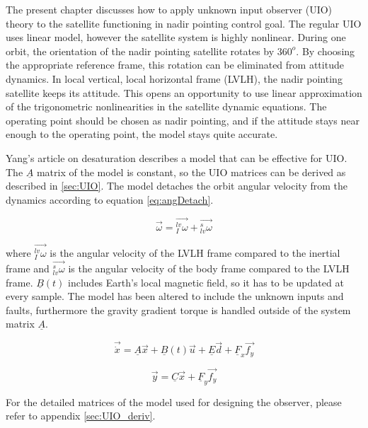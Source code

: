 The present chapter discusses how to apply unknown input observer (UIO) theory to the satellite functioning in nadir pointing control goal. The regular UIO uses linear model, however the satellite system is highly nonlinear.  During one orbit, the orientation of the nadir pointing satellite rotates by $360^o$. By choosing the appropriate reference frame, this rotation can be eliminated from attitude dynamics. In local vertical, local horizontal frame (LVLH), the nadir pointing satellite keeps its attitude. This opens an opportunity to use linear approximation of the trigonometric nonlinearities in the satellite dynamic equations. The operating point should be chosen as nadir pointing, and if the attitude stays near enough to the operating point, the model stays quite accurate.


Yang's article on desaturation \cite{DesatYang} describes a model that can be effective for UIO. The $\underline{A}$ matrix of the model is constant, so the UIO matrices can be derived as described in \ref{sec:UIO}. The model detaches the orbit angular velocity from the dynamics according to equation \ref{eq:angDetach}.

\begin{equation}
\label{eq:angDetach}
\vec{\omega} = \vec{_I^{lv}\omega} + \vec{_{lv}^s\omega}
\end{equation}

where $\vec{_I^{lv}\omega}$ is the angular velocity of the LVLH frame compared to the inertial frame and $\vec{_{lv}^s\omega}$ is the angular velocity of the body frame compared to the LVLH frame. $\underline{B}(t)$ includes Earth's local magnetic field, so it has to be updated at every sample. The model has been altered to include the unknown inputs and faults, furthermore the gravity gradient torque is handled outside of the system matrix $\underline{A}$.

\begin{equation}
\vec{\dot{x}} =
\underline{A}\vec{x} + \underline{B}(t)\vec{u} + \underline{E} \vec{d} + \underline{F}_x \vec{f_y} 
\label{eq:uioagain}
\end{equation}

\begin{equation}
\vec{y} =
\underline{C}\vec{x} + \underline{F}_y \vec{f_y} 
\label{eq:uioagain2}
\end{equation}

 For the detailed matrices of the model used for designing the observer, please refer to appendix \ref{sec:UIO_deriv}.

